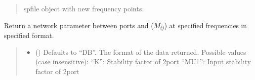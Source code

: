 \documentclass[letterpaper,10pt,english]{sphinxmanual}
\begin{document}
\begin{fulllineitems}
\begin{fulllineitems}
\begin{quote}
\begin{description}
\begin{itemize}
\end{itemize}

\sphinxAtStartPar
spfile object with new frequency points.

\sphinxAtStartPar
{\hyperref[\detokenize{touchstone:touchstone.spfile}]{}}

\end{description}\end{quote}

\end{fulllineitems}


\begin{fulllineitems}
\label{\detokenize{touchstone:touchstone.spfile.data_array}}
\pysigstartsignatures
{}
\pysigstopsignatures
\sphinxAtStartPar
Return a network parameter between ports  and  (\(M_{i j}\)) at specified frequencies in specified format.
\begin{quote}\begin{description}
\begin{itemize}
\item {}
\sphinxAtStartPar
{} (\sphinxstyleliteralemphasis{\sphinxupquote{, }}) \textendash{} Defaults to “DB”. The format of the data returned. Possible values (case insensitive):
\sphinxhyphen{}   “K”: Stability factor of 2\sphinxhyphen{}port
\sphinxhyphen{}   “MU1”: Input stability factor of 2\sphinxhyphen{}port

\end{itemize}
\end{description}
\end{quote}
\end{fulllineitems}
\end{fulllineitems}
\end{document}
